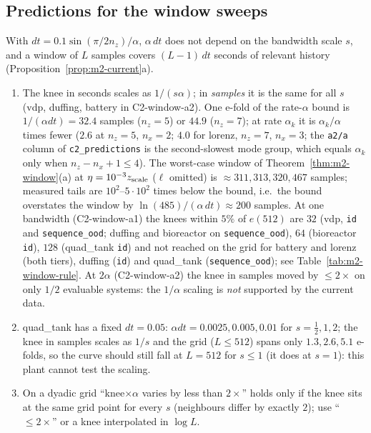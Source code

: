 \subsection{Predictions for the window sweeps}
With $dt=0.1\sin(\pi/2n_z)/\alpha$, $\alpha\,dt$ does not depend on the bandwidth scale $s$, and a window of $L$
samples covers $(L-1)\,dt$ seconds of relevant history (Proposition~\ref{prop:m2-current}a).
\begin{enumerate}
\item The knee in seconds scales as $1/(s\alpha)$; in \emph{samples} it is the same for all $s$ (vdp, duffing,
battery in C2-window-a2). One e-fold of the rate-$\alpha$ bound is $1/(\alpha dt)=32.4$ samples ($n_z=5$) or
$44.9$ ($n_z=7$); at rate $\alpha_k$ it is $\alpha_k/\alpha$ times fewer ($2.6$ at $n_z=5$, $n_x=2$; $4.0$ for lorenz,
$n_z=7$, $n_x=3$; the \texttt{a2/a} column of \texttt{c2\_predictions} is the second-slowest mode group, which equals
$\alpha_k$ only when $n_z-n_x+1\le4$). The worst-case window of
Theorem~\ref{thm:m2-window}(a) at $\eta=10^{-3}z_{\rm scale}$ ($\ell$ omitted) is $\approx311,313,320,467$ samples;
measured tails are $10^2$--$5\cdot10^2$ times below the bound, i.e.\ the bound overstates the window by
$\ln(485)/(\alpha\,dt)\approx200$ samples. At one bandwidth (C2-window-a1) the knees within $5\%$ of $e(512)$ are $32$ (vdp,
\texttt{id} and \texttt{sequence\_ood}; duffing and bioreactor on \texttt{sequence\_ood}), $64$ (bioreactor \texttt{id}),
$128$ (quad\_tank \texttt{id}) and not reached on the grid for battery and lorenz (both tiers), duffing (\texttt{id}) and
quad\_tank (\texttt{sequence\_ood}); see Table~\ref{tab:m2-window-rule}. At $2\alpha$ (C2-window-a2) the knee in samples
moved by $\le2\times$ on only $1/2$ evaluable systems: the $1/\alpha$ scaling is \emph{not} supported by the current data.
\item quad\_tank has a fixed $dt=0.05$: $\alpha dt=0.0025,0.005,0.01$ for $s=\tfrac12,1,2$; the knee in samples scales as
$1/s$ and the grid ($L\le512$) spans only $1.3,2.6,5.1$ e-folds, so the curve should still fall at $L=512$ for
$s\le1$ (it does at $s=1$): this plant cannot test the scaling.
\item On a dyadic grid ``knee$\times\alpha$ varies by less than $2\times$'' holds only if the knee sits at the same grid
point for every $s$ (neighbours differ by exactly $2$); use ``$\le2\times$'' or a knee interpolated in $\log L$.
\end{enumerate}

